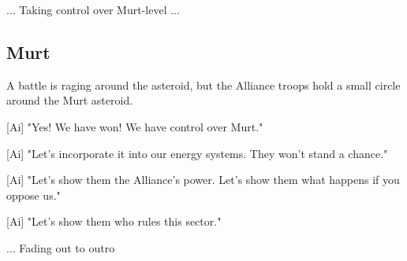 \documentclass[a4paper,12pt]{article}
\begin{document}
... Taking control over Murt-level ...

\subsection{Murt}

A battle is raging around the asteroid, but the Alliance troops hold a small circle around the Murt asteroid.

[Ai] "Yes! We have won! We have control over Murt."

[Ai] "Let's incorporate it into our energy systems. They won't stand a chance."

[Ai] "Let's show them the Alliance's power. Let's show them what happens if you oppose us."

[Ai] "Let's show them who rules this sector."

... Fading out to outro
\end{document}
